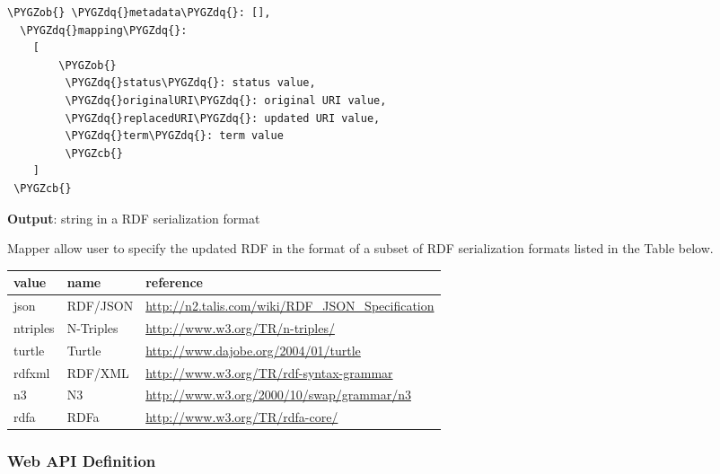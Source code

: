 \documentclass[letterpaper,10pt,english]{sphinxmanual}
\def\PYGZob{\char`\{}
\def\PYGZcb{\char`\}}
\def\PYGZdq{\char`\"}
\begin{document}
\begin{Verbatim}[commandchars=\\\{\}]
\PYGZob{} \PYGZdq{}metadata\PYGZdq{}: [],
  \PYGZdq{}mapping\PYGZdq{}:
    [
        \PYGZob{}
         \PYGZdq{}status\PYGZdq{}: status value,
         \PYGZdq{}originalURI\PYGZdq{}: original URI value,
         \PYGZdq{}replacedURI\PYGZdq{}: updated URI value,
         \PYGZdq{}term\PYGZdq{}: term value
         \PYGZcb{}
    ]
 \PYGZcb{}
\end{Verbatim}

\textbf{Output}: string in a RDF serialization format

Mapper allow user to specify the updated RDF in the format of a subset of RDF serialization formats listed in the Table below.

\begin{tabulary}{\linewidth}{|L|L|L|}
\hline
\textsf{\relax 
value
} & \textsf{\relax 
name
} & \textsf{\relax 
reference
}\\
\hline
json
 & 
RDF/JSON
 & 
\href{http://n2.talis.com/wiki/RDF\_JSON\_Specification}{http://n2.talis.com/wiki/RDF\_JSON\_Specification}
\\

ntriples
 & 
N-Triples
 & 
\href{http://www.w3.org/TR/n-triples/}{http://www.w3.org/TR/n-triples/}
\\

turtle
 & 
Turtle
 & 
\href{http://www.dajobe.org/2004/01/turtle}{http://www.dajobe.org/2004/01/turtle}
\\

rdfxml
 & 
RDF/XML
 & 
\href{http://www.w3.org/TR/rdf-syntax-grammar}{http://www.w3.org/TR/rdf-syntax-grammar}
\\

n3
 & 
N3
 & 
\href{http://www.w3.org/2000/10/swap/grammar/n3}{http://www.w3.org/2000/10/swap/grammar/n3}
\\

rdfa
 & 
RDFa
 & 
\href{http://www.w3.org/TR/rdfa-core/}{http://www.w3.org/TR/rdfa-core/}
\\
\hline\end{tabulary}



\subsubsection{Web API Definition}
\label{docs/mapper:web-api-definition}
\end{document}
